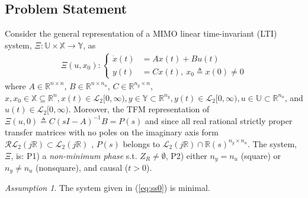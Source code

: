 \documentclass[journal]{IEEEtran}
\theoremstyle{remark}
\newtheorem{assumption}{Assumption}
\begin{document}
\subsection{Problem Statement} \label{sec:problem}
Consider the general representation of a MIMO linear time-invariant (LTI) system, $\Xi: \mathbb{U} \times \mathbb{X} \to \mathbb{Y}$, as
\begin{align} \label{eq:ss0}
\Xi(u,x_0) : \begin{cases}
\dot{x}(t)&= Ax(t)+Bu(t)\\ 
 y(t)&= C x(t), \ x_0\triangleq x(0) \ne 0
\end{cases}
\end{align} 
where $A \in \mathbb{R}^{n\times n}$, $B\in \mathbb{R}^{n\times n_u}$,  $C\in \mathbb{R}^{n_y \times n}$, $x, x_0 \in \mathbb{X} \subseteq \mathbb{R}^{n}, x(t) \in \mathcal{L}_2[0,\infty),  y \in \mathbb{Y} \subset  \mathbb{R}^{n_y}, y(t) \in \mathcal{L}_2[0,\infty), u \in \mathbb{U} \subset \mathbb{R}^{n_u}$, and $u(t) \in \mathcal{L}_2[0,\infty)$. Moreover, the TFM representation of $\Xi(u,0) \triangleq C(sI-A)^{-1}B =P(s)$ and since all real rational strictly proper transfer matrices with no poles on the
imaginary axis form $\mathcal{RL}_2(j\mathbb{R}) \subset \mathcal{L}_2(j\mathbb{R})$ \cite[page 48]{zhou1998essentials}, $ P(s) $ belongs to $ \mathcal{L}_2(j\mathbb{R})\cap \mathbb{R}(s)^{n_y \times n_u}$. The system, $\Xi$, is: P1) a \textit{non-minimum phase} s.t. $Z_R \ne \emptyset$, P2) either $n_y=n_u$ (square) or $n_y \ne n_u$ (nonsquare), and causal ($t > 0 $).
\begin{assumption}\label{ass:minimalABC}
The system given in (\ref{eq:ss0}) is minimal.
\end{assumption}
\end{document}

